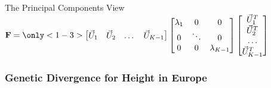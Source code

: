 \documentclass{beamer}
\begin{document}
\begin{frame}[t]
{\begin{block}{The Principal Components View}
		\centering$\mathbf{F} = 
					\only<1-3>{\begin{bmatrix}
						\vec{U}_1&	\vec{U}_2& \dots&	\vec{U}_{K-1}
					\end{bmatrix}
					\begin{bmatrix}
						\lambda_1&	0&	0\\	
						0&	\ddots&	0\\
						0&	0&	\lambda_{K-1}
					\end{bmatrix}
					\begin{bmatrix}
						\vec{U}_1^T\\	\vec{U}_2^T\\ \dots\\	\vec{U}_{K-1}^T
					\end{bmatrix}}$
	\end{block}}
\end{frame}


\begin{frame}
\frametitle{Genetic Divergence for Height in Europe}
\end{frame}
\end{document}
